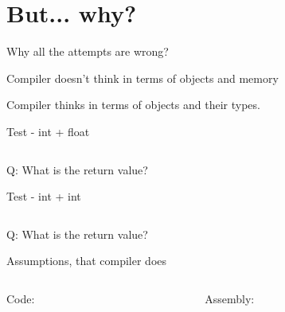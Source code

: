 \documentclass{panicsoftware-presentation}
\begin{document}
\section*{But... why?}

\begin{frame}{Why all the attempts are wrong?}

\centerline{Compiler \alert{doesn't} think in terms of \alert{objects and memory}}
\vskip 1cm
\pause 

\centerline{Compiler thinks in terms of \alert{objects and their types}.}

\end{frame}

\begin{frame}{Test - int + float}

\inputminted{\myCpp}{examples/TBAA-simple-example.cpp}

\vfill
\pause
\centerline{Q: \alert{What is the return value?}}

\end{frame}

\begin{frame}{Test - int + int}

\inputminted{\myCpp}{examples/Non-TBAA-simple-example.cpp}
\vfill
\pause
\centerline{Q: \alert{What is the return value?}}

\end{frame}

\begin{frame}{Assumptions, that compiler does}

\begin{columns}[t]

\begin{column}{0.58\linewidth}


\centerline{Code:}

\vfill

\inputminted[firstline=9]{\myCpp}{examples/TBAA-simple-example.cpp}

\end{column}


\begin{column}{0.28\linewidth}

\centerline{Assembly:}

\vfill

\centering\inputminted{gas}{examples/TBAA-simple-example.asm}

\end{column}

\end{columns}

\end{frame}
\end{document}
